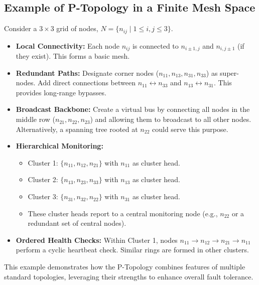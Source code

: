 \documentclass[10pt]{article}
\begin{document}
\subsection{Example of P-Topology in a Finite Mesh Space}
Consider a $3 \times 3$ grid of nodes, $N = \{n_{ij} \mid 1 \le i,j \le 3\}$.

\begin{itemize}
    \item \textbf{Local Connectivity:} Each node $n_{ij}$ is connected to $n_{i \pm 1, j}$ and $n_{i, j \pm 1}$ (if they exist). This forms a basic mesh.
    \item \textbf{Redundant Paths:} Designate corner nodes ($n_{11}, n_{13}, n_{31}, n_{33}$) as super-nodes. Add direct connections between $n_{11} \leftrightarrow n_{33}$ and $n_{13} \leftrightarrow n_{31}$. This provides long-range bypasses.
    \item \textbf{Broadcast Backbone:} Create a virtual bus by connecting all nodes in the middle row ($n_{21}, n_{22}, n_{23}$) and allowing them to broadcast to all other nodes. Alternatively, a spanning tree rooted at $n_{22}$ could serve this purpose.
    \item \textbf{Hierarchical Monitoring:}
        \begin{itemize}
            \item Cluster 1: $\{n_{11}, n_{12}, n_{21}\}$ with $n_{11}$ as cluster head.
            \item Cluster 2: $\{n_{13}, n_{23}, n_{33}\}$ with $n_{13}$ as cluster head.
            \item Cluster 3: $\{n_{31}, n_{32}, n_{22}\}$ with $n_{31}$ as cluster head.
            \item These cluster heads report to a central monitoring node (e.g., $n_{22}$ or a redundant set of central nodes).
        \end{itemize}
    \item \textbf{Ordered Health Checks:} Within Cluster 1, nodes $n_{11} \to n_{12} \to n_{21} \to n_{11}$ perform a cyclic heartbeat check. Similar rings are formed in other clusters.
\end{itemize}
This example demonstrates how the P-Topology combines features of multiple standard topologies, leveraging their strengths to enhance overall fault tolerance.
\end{document}
